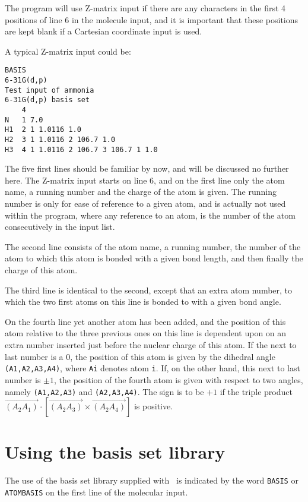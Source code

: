 The program will use Z-matrix input if there are
any characters 
in the first 4 positions of line 6 in the molecule input, and it is
important that these positions are kept blank if a Cartesian coordinate
input is  used.

A typical Z-matrix input could be:
\begin{verbatim}
BASIS
6-31G(d,p)
Test input of ammonia
6-31G(d,p) basis set
    4
N   1 7.0
H1  2 1 1.0116 1.0
H2  3 1 1.0116 2 106.7 1.0
H3  4 1 1.0116 2 106.7 3 106.7 1 1.0
\end{verbatim}
The five first lines should be familiar by now, and will be discussed
no further here. The Z-matrix input starts on line 6, and on the first
line only the atom name, a running number and the charge of the
atom
is given. The running number is only for
ease of reference to a given atom, and is actually not used within the
program, where any reference to an atom, is  the number of the
atom consecutively in the input list.

The second line consists of the atom name, a running number, the
number of the atom to which this atom is bonded with a given bond
length, and then finally the charge of this atom.

The third line is identical to the second, except that an extra atom
number, to which the two first atoms on this line is bonded to with a
given bond angle.

On the fourth line yet another atom has been added, and the position
of this atom relative to the three previous ones on this line is
dependent upon on an extra number inserted just before the nuclear
charge of this atom. If the next to last number is a 0, the
position of this atom is given by the dihedral angle {\tt
(A1,A2,A3,A4)}, where {\tt Ai} denotes atom {\tt i}. If, on the other
hand, this next to last number is $\pm 1$, the position of the fourth
atom is given with respect to two angles, namely {\tt (A1,A2,A3)} and
{\tt (A2,A3,A4)}. The sign is to be $+ 1$ if the triple product
$\overrightarrow{\left(A_{2}A_{1}\right)}\cdot\left[\overrightarrow{\left(A_{2}A_{3}\right)}\times\overrightarrow{\left(A_{2}A_{4}\right)}\right]$
is positive.

\section{Using the basis set library}\label{sec:molbasis}

The use of the basis set library supplied with \siraba\ is indicated
by the word {\tt BASIS} or {\tt ATOMBASIS} on the first line of the
molecular input. 

